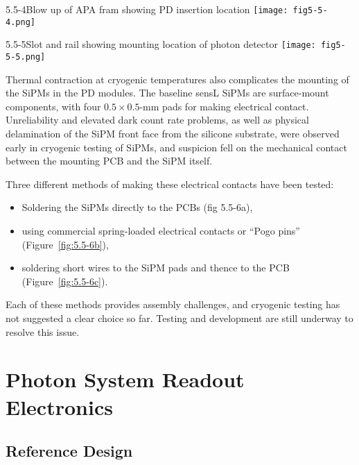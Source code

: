 \begin{cdrfigure}{5.5-4}{Blow up of APA fram showing PD insertion location}
  \texttt{[image: fig5-5-4.png]}
\end{cdrfigure}


\begin{cdrfigure}{5.5-5}{Slot and rail showing mounting location of photon detector}
  \texttt{[image: fig5-5-5.png]}
\end{cdrfigure}


Thermal contraction at cryogenic temperatures also complicates the
mounting of the SiPMs in the PD modules.  The baseline \fixme{} sensL SiPMs are
surface-mount components, with four $0.5\times0.5$-mm pads for making
electrical contact.  Unreliability  and elevated dark count rate
problems, as well as physical delamination of the SiPM front face from
the silicone substrate, were observed early in cryogenic testing of
SiPMs, and suspicion fell on the mechanical contact between the
mounting PCB and the SiPM itself.

Three different methods of making these electrical contacts have been tested: 
\begin{itemize}
\item Soldering
the SiPMs directly to the PCBs (fig 5.5-6a), 
\item using commercial
spring-loaded electrical contacts or ``Pogo pins'' (Figure~\ref{fig:5.5-6b}), 
\item soldering short wires to the SiPM pads and thence to the PCB
(Figure~\ref{fig:5.5-6c}).  
\end{itemize}
Each of these methods provides assembly challenges,
and cryogenic testing has not suggested a clear choice so far.
Testing and development are still underway to resolve this issue.

\section{Photon System Readout Electronics}
\label{sec_elec}

\subsection{Reference Design} %

